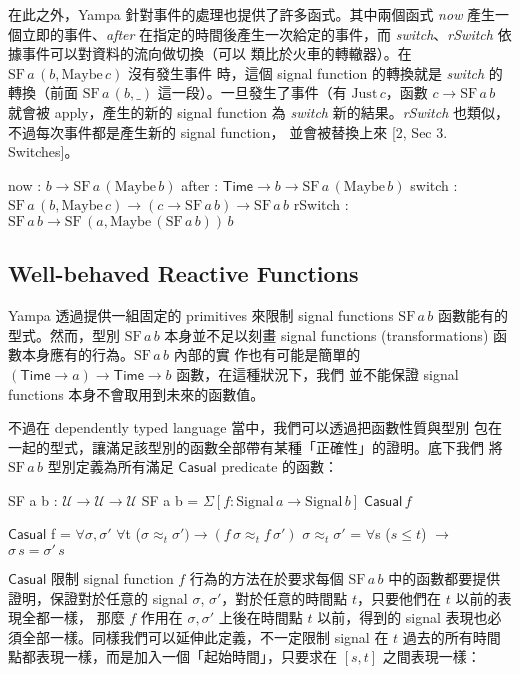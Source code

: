 \documentclass{article}
\newcommand{\Time}{\mathsf{Time}}
\newcommand{\U}{\mathcal{U}}
\newcommand{\E}[1]{\Sigma[#1]\;}
\begin{document}
  在此之外，Yampa 針對事件的處理也提供了許多函式。其中兩個函式 \textit{now}
  產生一個立即的事件、\textit{after} 在指定的時間後產生一次給定的事件，而
  \textit{switch}、\textit{rSwitch} 依據事件可以對資料的流向做切換（可以
  類比於火車的轉轍器）。在 $\text{SF}\,a\,(b,\text{Maybe}\,c)$ 沒有發生事件
  時，這個 signal function 的轉換就是 \textit{switch} 的轉換（前面 $\text{SF}\,a\,(b,\_)$ 這一段）。一旦發生了事件（有 $\text{Just}\,c$，函數 $c\to \text{SF}\,a\,b$ 就會被 apply，產生的新的 signal function 為 \textit{switch} 新的結果。\textit{rSwitch} 也類似，不過每次事件都是產生新的 signal function，
  並會被替換上來 [2, Sec 3. Switches]。

  \begin{code}
  now : $b\to \text{SF}\,a\,(\text{Maybe}\,b)$
  after : $\Time\to b\to \text{SF}\,a\,(\text{Maybe}\,b)$
  switch : $\text{SF}\,a\,(b,\text{Maybe}\,c)\to (c\to\text{SF}\,a\,b)\to\text{SF}\,a\,b$
  rSwitch : $\text{SF}\,a\,b\to\text{SF}\,(a,\text{Maybe}\,(\text{SF}\,a\,b))\,b$
  \end{code}

  \subsection{Well-behaved Reactive Functions}

  Yampa 透過提供一組固定的 primitives 來限制 signal functions $\text{SF}\,a\,b$
  函數能有的型式。然而，型別 $\text{SF}\,a\,b$ 本身並不足以刻畫 signal
  functions (transformations) 函數本身應有的行為。$\text{SF}\,a\,b$ 內部的實
  作也有可能是簡單的 $(\Time\to a)\to\Time\to b$ 函數，在這種狀況下，我們
  並不能保證 signal functions 本身不會取用到未來的函數值。

  不過在 dependently typed language 當中，我們可以透過把函數性質與型別
  包在一起的型式，讓滿足該型別的函數全部帶有某種「正確性」的證明。底下我們
  將 $\text{SF}\,a\,b$ 型別定義為所有滿足 $\textsf{Casual}$ predicate 的函數：

  \begin{code}
  SF a b : $\U\to\U\to\U$
  SF a b = $\E{f: \text{Signal}\, a \to \text{Signal}\, b} \mathsf{Casual}\, f$

  $\mathsf{Casual}$ f = $\forall{\sigma,\sigma'}$ $\forall${t} ($\sigma\approx_t\sigma')\to(f\,\sigma\approx_t f\,\sigma')$
  $\sigma\approx_t\sigma'$ = $\forall${s} ($s\le t$) $\to$ $\sigma\,s=\sigma'\,s$
  \end{code}

  $\mathsf{Casual}$ 限制 signal function $f$ 行為的方法在於要求每個
  $\text{SF}\,a\,b$ 中的函數都要提供證明，保證對於任意的 signal $\sigma$,
  $\sigma'$，對於任意的時間點 $t$，只要他們在 $t$ 以前的表現全都一樣，
  那麼 $f$ 作用在 $\sigma,\sigma'$ 上後在時間點 $t$ 以前，得到的 signal
  表現也必須全部一樣。同樣我們可以延伸此定義，不一定限制 signal 在 $t$
  過去的所有時間點都表現一樣，而是加入一個「起始時間」，只要求在 $[s,t]$
  之間表現一樣：
\end{document}
